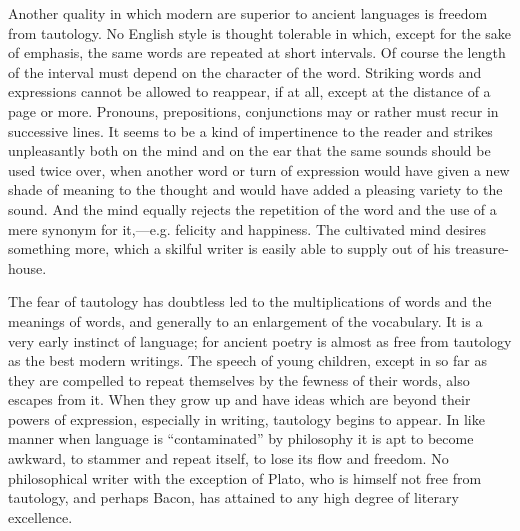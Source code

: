\documentclass[11pt,letter]{article}
\begin{document}
\par  Another quality in which modern are superior to ancient languages is freedom from tautology. No English style is thought tolerable in which, except for the sake of emphasis, the same words are repeated at short intervals. Of course the length of the interval must depend on the character of the word. Striking words and expressions cannot be allowed to reappear, if at all, except at the distance of a page or more. Pronouns, prepositions, conjunctions may or rather must recur in successive lines. It seems to be a kind of impertinence to the reader and strikes unpleasantly both on the mind and on the ear that the same sounds should be used twice over, when another word or turn of expression would have given a new shade of meaning to the thought and would have added a pleasing variety to the sound. And the mind equally rejects the repetition of the word and the use of a mere synonym for it,—e.g. felicity and happiness. The cultivated mind desires something more, which a skilful writer is easily able to supply out of his treasure-house.

\par  The fear of tautology has doubtless led to the multiplications of words and the meanings of words, and generally to an enlargement of the vocabulary. It is a very early instinct of language; for ancient poetry is almost as free from tautology as the best modern writings. The speech of young children, except in so far as they are compelled to repeat themselves by the fewness of their words, also escapes from it. When they grow up and have ideas which are beyond their powers of expression, especially in writing, tautology begins to appear. In like manner when language is “contaminated” by philosophy it is apt to become awkward, to stammer and repeat itself, to lose its flow and freedom. No philosophical writer with the exception of Plato, who is himself not free from tautology, and perhaps Bacon, has attained to any high degree of literary excellence.
\end{document}
